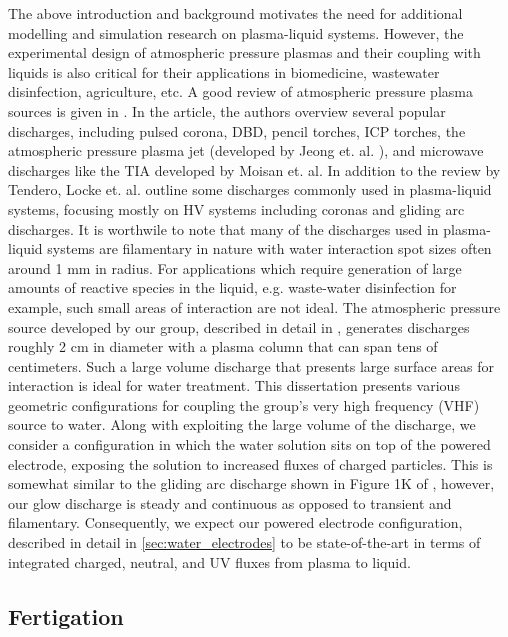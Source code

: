 The above introduction and background motivates the need for additional modelling and simulation research on plasma-liquid systems. However, the experimental design of atmospheric pressure plasmas and their coupling with liquids is also critical for their applications in biomedicine, wastewater disinfection, agriculture, etc. A good review of atmospheric pressure plasma sources is given in \cite{tendero2006atmospheric}. In the article, the authors overview several popular discharges, including pulsed corona, DBD, pencil torches, ICP torches, the atmospheric pressure plasma jet (developed by Jeong et. al. \cite{park2001discharge}), and microwave discharges like the TIA developed by Moisan et. al. \cite{moisan1994atmospheric} In addition to the review by Tendero, Locke et. al. outline some discharges commonly used in plasma-liquid systems, focusing mostly on HV systems including coronas and gliding arc discharges. \cite{locke2006electrohydraulic} It is worthwile to note that many of the discharges used in plasma-liquid systems are filamentary in nature with water interaction spot sizes often around 1 mm in radius. For applications which require generation of large amounts of reactive species in the liquid, e.g. waste-water disinfection for example, such small areas of interaction are not ideal. The atmospheric pressure source developed by our group, described in detail in \cite{byrns2012vhf}, generates discharges roughly 2 cm in diameter with a plasma column that can span tens of centimeters. Such a large volume discharge that presents large surface areas for interaction is ideal for water treatment. This dissertation presents various geometric configurations for coupling the group's very high frequency (VHF) source to water. Along with exploiting the large volume of the discharge, we consider a configuration in which the water solution sits on top of the powered electrode, exposing the solution to increased fluxes of charged particles. This is somewhat similar to the gliding arc discharge shown in Figure 1K of \cite{locke2006electrohydraulic}, however, our glow discharge is steady and continuous as opposed to transient and filamentary. Consequently, we expect our powered electrode configuration, described in detail in \cref{sec:water_electrodes} to be state-of-the-art in terms of integrated charged, neutral, and UV fluxes from plasma to liquid.

\subsection{Fertigation}
\label{sec:int_ag}

